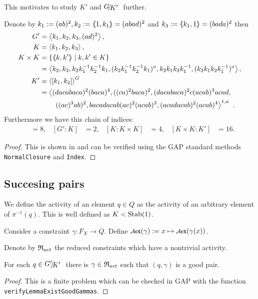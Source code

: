 \documentclass[a4paper,12pt]{article}
\begin{document}
This motivates to study $K'$ and $\RNK{G}{K'}$ further.
\begin{lem} \label{lem:subgroupsOfG}
Denote by $k_1 := (ab)^2, k_2:=\langle\negthickspace\langle1,k_1\rangle\negthickspace\rangle = (abad)^2$ and $k_3:=\langle\negthickspace\langle k_1,1\rangle\negthickspace\rangle = (bada)^2$ then 
 \begin{align*}
  G' &= \left< k_1,k_2,k_3,(ad)^2\right>, \\
  K &= \left< k_1,k_2,k_3\right>, \\
  K\times K &= \{\langle\negthickspace\langle k,k'\rangle\negthickspace\rangle \mid k,k'\in K\} \\&= \left< k_2,k_3,k_2k_1^{-1}k_2^{-1}k_1,(k_2k_1^{-1}k_2^{-1}k_1)^a,k_2k_1k_2k_1^{-1},(k_2k_1k_2k_1^{-1})^a  \right>,\\
  K' &= \left< [k_1,k_2] \right>^G \\ 
  &= \left<(dacabaca)^2(baca)^4,((ca)^2baca)^2,(dacabaca)^2c(acab)^3acad,\right.\\
  &\qquad\left.((ac)^3ab)^2, bacadacab(ac)^2(acab)^3, (acadacab)^2(acab)^4\right>^{1,a}\ .
 \end{align*}
Furthermore we have this chain of indices:
\begin{align*}
  [G:G']&=8, & [G':K]&=2, &[K:K\times K]&= 4, &[K\times K:K']&=16. 
\end{align*}
\end{lem}
\begin{proof}
 This is shown in \cite{Bartholdi:BranchGroups} and can be verified using the GAP standard methods
 \lstinline{NormalClosure} and \lstinline{Index}. 
\end{proof}

\subsection{Succesing pairs}
\begin{defi}
 We define the activity of an element $q\in Q$ as the activity of an arbitrary element of $\pi^{-1}(q)$. 
 This is well defined as $K<\textup{Stab}(1)$. 
 
 Consider a constraint $\gamma\colon F_X \to Q$. 
 Define $\act(\gamma):= x \mapsto \act(\gamma(x))$.
 
 Denote by $\mathfrak{R}_{act}$ the reduced constraints which have a nontrivial activity.
\end{defi}

\begin{lem} \label{lem:existsGoodGamma}
 For each $q\in\RNK{G'}{K'}$ there is $\gamma\in \mathfrak{R}_{act}$ such that $(q,\gamma)$ is a 
 good pair.
\end{lem}
\begin{proof}
 This is a finite problem which can be checked in GAP with the function \lstinline{verifyLemmaExistGoodGammas}.
\end{proof}
\end{document}
